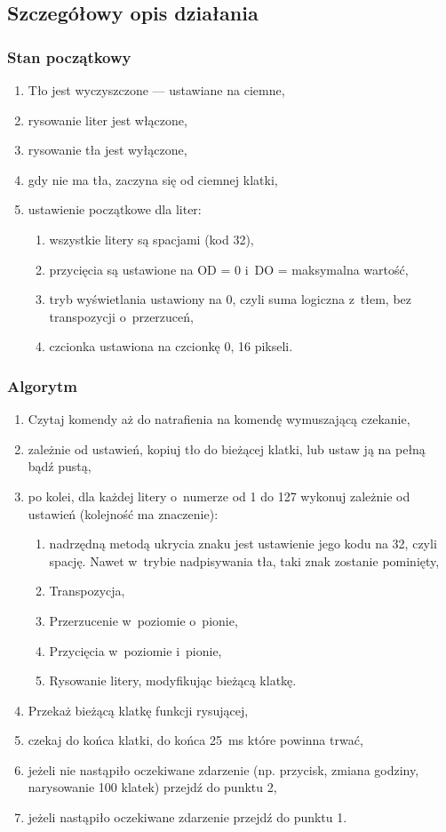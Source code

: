 \subsection{Szczegółowy opis działania}
\label{algorithm-description}
\subsubsection*{Stan początkowy}
\begin{enumerate}
	\item Tło jest wyczyszczone --- ustawiane na ciemne,
	\item rysowanie liter jest włączone,
	\item rysowanie tła jest wyłączone,
	\item gdy nie ma tła, zaczyna się od ciemnej klatki,
	\item ustawienie początkowe dla liter:
	\begin{enumerate}
		\item wszystkie litery są spacjami (kod 32),
		\item przycięcia są ustawione na OD = 0 i~DO = maksymalna wartość,
		\item tryb wyświetlania ustawiony na 0, czyli suma logiczna z~tłem, bez transpozycji o~przerzuceń,
		\item czcionka ustawiona na czcionkę 0, 16 pikseli.
	\end{enumerate}
\end{enumerate}

\subsubsection*{Algorytm}
\begin{enumerate}
	\item Czytaj komendy aż do natrafienia na komendę wymuszającą czekanie,
	\item zależnie od ustawień, kopiuj tło do bieżącej klatki, lub ustaw ją na pełną bądź pustą,
	\item po kolei, dla każdej litery o~numerze od 1 do 127 wykonuj zależnie od ustawień (kolejność ma znaczenie):
	\begin{enumerate}
		\item nadrzędną metodą ukrycia znaku jest ustawienie jego kodu na 32, czyli spację. Nawet w~trybie nadpisywania tła, taki znak zostanie pominięty,
		\item Transpozycja,
		\item Przerzucenie w~poziomie o~pionie,
		\item Przycięcia w~poziomie i~pionie,
		\item Rysowanie litery, modyfikując bieżącą klatkę.
	\end{enumerate}
	\item Przekaż bieżącą klatkę funkcji rysującej,
	\item czekaj do końca klatki, do końca 25~ms które powinna trwać,
	\item jeżeli nie nastąpiło oczekiwane zdarzenie (np. przycisk, zmiana godziny, narysowanie 100 klatek) przejdź do punktu 2,
	\item jeżeli nastąpiło oczekiwane zdarzenie przejdź do punktu 1.
\end{enumerate}

